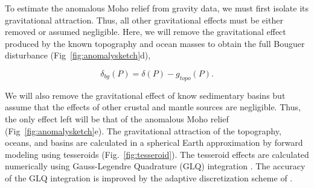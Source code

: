 \documentclass[extra,mreferee]{gji}
\begin{document}
To estimate the anomalous Moho relief from gravity data,
we must first isolate its gravitational attraction.
Thus, all other gravitational effects
must be either removed or assumed negligible.
Here, we will remove the gravitational effect produced by the known topography
and ocean masses to obtain the full Bouguer disturbance
(Fig~\ref{fig:anomalysketch}d),

\begin{equation}
    \delta_{bg}(P) = \delta(P) - g_{topo}(P).
    \label{eq:bouguer}
\end{equation}

\noindent
We will also remove the gravitational effect of know sedimentary basins
but assume that the effects of
other crustal and mantle sources are negligible.
Thus, the only effect left will be that of the anomalous Moho relief
(Fig~\ref{fig:anomalysketch}e).
The gravitational attraction of the topography, oceans, and basins are
calculated in a spherical Earth approximation by forward modeling using
tesseroids (Fig.~\ref{fig:tesseroid}).
The tesseroid effects are calculated numerically using
Gauss-Legendre Quadrature (GLQ) integration \citep{asgharzadeh2007}.
The accuracy of the GLQ integration is improved by the adaptive discretization
scheme of \citet{uieda2016}.
\end{document}
